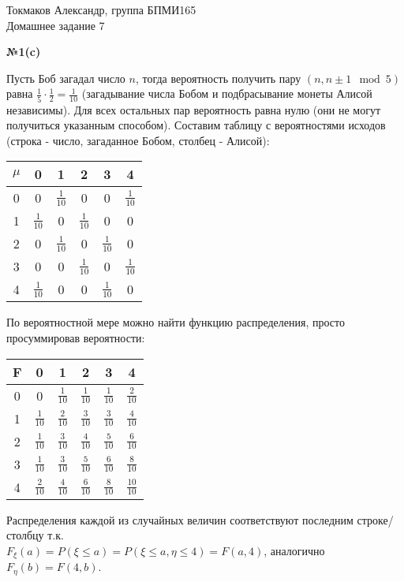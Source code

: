 \documentclass{article}
\newenvironment{task}{\begin{center}\fontsize{14}{14}\selectfont\bf}{\rm\fontsize{12}{12}\selectfont\end{center}}
\begin{document}
	\begin{center}
		Токмаков Александр, группа БПМИ165 \\
		Домашнее задание 7
	\end{center}
	
	\begin{task} 
		№1(c)
	\end{task}
	Пусть Боб загадал число $n$, тогда вероятность получить пару $(n, n \pm 1 \mod 5)$ равна $\frac{1}{5}\cdot \frac{1}{2} = \frac{1}{10}$ (загадывание числа Бобом и подбрасывание монеты Алисой независимы). Для всех остальных пар вероятность равна нулю (они не могут получиться указанным способом). Составим таблицу с вероятностями исходов (строка - число, загаданное Бобом, столбец - Алисой):
	\begin{center}
		\begin{tabular}{|c|c|c|c|c|c|}
			\hline 
			$\mu$	& 0 & 1 & 2 & 3 & 4 \\
			\hline
			0	& 0 & $\frac{1}{10}$ & 0 & 0 & $\frac{1}{10}$ \\
			\hline
			1	& $\frac{1}{10}$ & 0 & $\frac{1}{10}$ & 0 & 0 \\
			\hline
			2	& 0 & $\frac{1}{10}$ & 0 & $\frac{1}{10}$ & 0 \\
			\hline
			3	& 0 & 0 & $\frac{1}{10}$ & 0 & $\frac{1}{10}$ \\
			\hline
			4	& $\frac{1}{10}$ & 0 & 0 & $\frac{1}{10}$ & 0 \\
			\hline
		\end{tabular}
	\end{center}
	По вероятностной мере можно найти функцию распределения, просто просуммировав вероятности:
	\begin{center}
		\begin{tabular}{|c|c|c|c|c|c|}
			\hline 
			F & 0 & 1 & 2 & 3 & 4 \\
			\hline
			0	& 0 			 & $\frac{1}{10}$ & $\frac{1}{10}$ & $\frac{1}{10}$ & $\frac{2}{10}$ \\
			\hline
			1	& $\frac{1}{10}$ & $\frac{2}{10}$ & $\frac{3}{10}$ & $\frac{3}{10}$ & $\frac{4}{10}$ \\
			\hline
			2	& $\frac{1}{10}$ & $\frac{3}{10}$ & $\frac{4}{10}$ & $\frac{5}{10}$ & $\frac{6}{10}$ \\
			\hline
			3	& $\frac{1}{10}$ & $\frac{3}{10}$ & $\frac{5}{10}$ & $\frac{6}{10}$ & $\frac{8}{10}$ \\
			\hline
			4	& $\frac{2}{10}$ & $\frac{4}{10}$ & $\frac{6}{10}$ & $\frac{8}{10}$ & $\frac{10}{10}$ \\
			\hline
		\end{tabular}
	\end{center}
	Распределения каждой из случайных величин соответствуют последним строке/столбцу т.к.\\ $F_\xi(a) = P(\xi \leq a) = P(\xi \leq a, \eta \leq 4) = F(a, 4)$, аналогично $F_\eta(b) = F(4, b)$.
	
\end{document}
